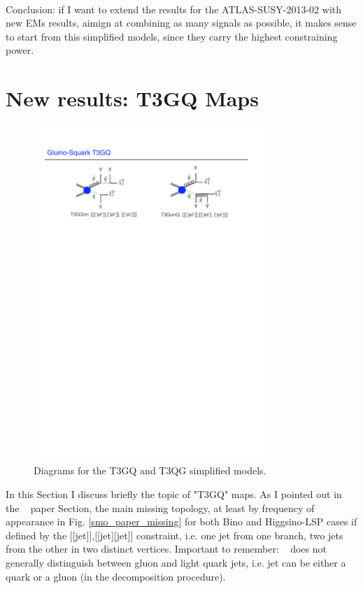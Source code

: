 \documentclass[a4paper,11pt]{article}
\begin{document}
\\

Conclusion: if I want to extend the results for the ATLAS-SUSY-2013-02 with new EMs results, aimign at combining as many signals as possible, it makes sense to start from this simplified models, since they carry the highest constraining power. 


\clearpage
\section{New results: T3GQ Maps}
\begin{figure}[!]
	\begin{center}
		\includegraphics[width=0.8\textwidth]{Fig/TGQ/TGQ.pdf}
	\end{center}
	\caption{Diagrams for the T3GQ and T3QG simplified models.}
	\label{tgq}
\end{figure}

In this Section I discuss briefly the topic of "T3GQ" maps. As I pointed out in the \SMO~ paper Section, the main missing topology, at least by frequency of appearance in Fig. \ref{smo_paper_missing} for both Bino and Higgsino-LSP cases if defined by the [[jet]],[[jet][jet]] constraint, i.e. one jet from one branch, two jets from the other in two distinct vertices. Important to remember: \SMO~ does not generally distinguish between gluon and light quark jets, i.e. jet can be either a quark or a gluon (in the decomposition procedure). 
\\
\end{document}
